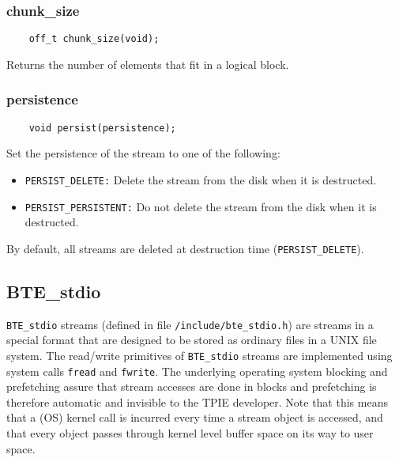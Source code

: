 \subsubsection{chunk\_size}
\begin{verbatim}
    off_t chunk_size(void);
\end{verbatim}
Returns the number of elements that fit in a logical block.

\subsubsection{persistence}
\begin{verbatim}
    void persist(persistence);
\end{verbatim}
Set the persistence of the stream to one of the following:
\begin{itemize}
\item \verb|PERSIST_DELETE:| Delete the stream from the disk when it is
  destructed.
\item \verb|PERSIST_PERSISTENT:| Do not delete the stream from the disk when
  it is destructed.
\end{itemize}

By default, all streams are deleted at destruction time
(\verb|PERSIST_DELETE|).


\subsection{BTE\_stdio}

\tobeextended

\verb|BTE_stdio| streams (defined in file \verb|/include/bte_stdio.h|) are
streams in a special format that are designed to be stored as ordinary
files in a UNIX file system. The read/write primitives of \verb|BTE_stdio|
streams are implemented using system calls \verb|fread| and
\verb|fwrite|. The underlying operating system blocking and prefetching
assure that stream accesses are done in blocks and prefetching is therefore
automatic and invisible to the TPIE developer. Note that this means that a
(OS) kernel call is incurred every time a stream object is
accessed, and that every object passes through kernel level buffer space on
its way to user space.


